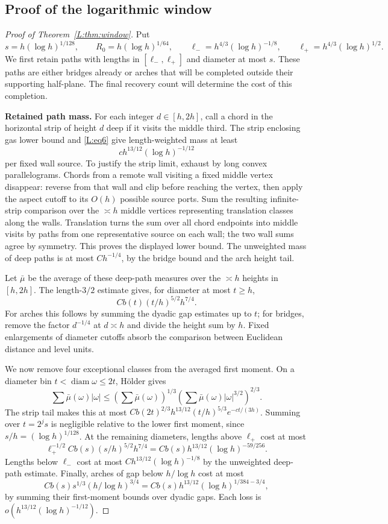 \documentclass[11pt]{article}
\numberwithin{equation}{section}
\theoremstyle{definition}\newtheorem{definition}[theorem]{Definition}
\theoremstyle{remark}\newtheorem{remark}[theorem]{Remark}
\begin{document}
\subsection{Proof of the logarithmic window}\label{L:step20}
\begin{proof}[Proof of Theorem~\ref{L:thm:window}]
Put
\[
 s=h(\log h)^{1/128},\qquad R_0=h(\log h)^{1/64},\qquad
 \ell_-=h^{4/3}(\log h)^{-1/8},\qquad
 \ell_+=h^{4/3}(\log h)^{1/2}.
\]
We first retain paths with lengths in $[\ell_-,\ell_+]$ and diameter
at most $s$.  These paths are either bridges already or arches that
will be completed outside their supporting half-plane.  The final
recovery count will determine the cost of this completion.

  \textbf{Retained path mass.}
For each integer $d\in[h,2h]$, call a chord in the horizontal strip
of height $d$ deep if it visits the middle third.  The strip enclosing
gas lower bound and \eqref{L:eq6} give length-weighted mass at least
\[
 c h^{13/12}(\log h)^{-1/12}
\]
per fixed wall source.  To justify the strip limit, exhaust by long
convex parallelograms.  Chords from a remote wall visiting a fixed
middle vertex disappear: reverse from that wall and clip before
reaching the vertex, then apply the aspect cutoff to its $O(h)$
possible source ports.  Sum the resulting infinite-strip comparison
over the $\asymp h$ middle vertices representing translation classes
along the walls.  Translation turns the sum over all chord endpoints
into middle visits by paths from one representative source on each
wall; the two wall sums agree by symmetry.  This proves the displayed
lower bound.  The unweighted mass of deep paths is at most
$Ch^{-1/4}$, by the bridge bound and the arch height tail.

Let $\bar\mu$ be the average of these deep-path measures over the
$\asymp h$ heights in $[h,2h]$.
The length-$3/2$ estimate gives, for diameter at most $t\ge h$,
\[
 Cb(t)(t/h)^{5/2}h^{7/4}.
\]
For arches this follows by summing the dyadic gap estimates up to
$t$; for bridges, remove the factor $d^{-1/4}$ at $d\asymp h$
and divide the height sum by $h$.  Fixed enlargements of diameter
cutoffs absorb the comparison between Euclidean distance and level
units.

We now remove four exceptional classes from the averaged first
moment.  On a diameter bin $t<\operatorname{diam}\omega\le2t$,
H\"older gives
\[
 \sum\bar\mu(\omega)|\omega|
 \le\left(\sum\bar\mu(\omega)\right)^{1/3}
      \left(\sum\bar\mu(\omega)|\omega|^{3/2}\right)^{2/3}.
\]
The strip tail makes this at most
$Cb(2t)^{2/3}h^{13/12}(t/h)^{5/3}e^{-ct/(3h)}$.
Summing over $t=2^js$ is negligible relative to the lower first
moment, since $s/h=(\log h)^{1/128}$.
At the remaining diameters, lengths above $\ell_+$ cost at most
\[
 \ell_+^{-1/2}Cb(s)(s/h)^{5/2}h^{7/4}
 =Cb(s)h^{13/12}(\log h)^{-59/256}.
\]
Lengths below $\ell_-$ cost at most
$Ch^{13/12}(\log h)^{-1/8}$ by the unweighted deep-path estimate.
Finally, arches of gap below $h/\log h$ cost at most
\[
 Cb(s)s^{1/3}(h/\log h)^{3/4}
 =Cb(s)h^{13/12}(\log h)^{1/384-3/4},
\]
by summing their first-moment bounds over dyadic gaps.
Each loss is $o(h^{13/12}(\log h)^{-1/12})$.


\end{proof}
\end{document}
